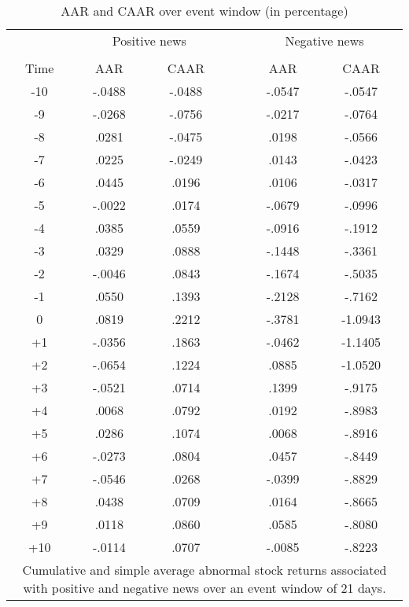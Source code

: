 \begin{table}[H]
\centering
\begin{tabular}{cccccc}
  \hline
   & \multicolumn{2}{c}{Positive news} & \multicolumn{1}{p{1.5cm}}{} & \multicolumn{2}{c}{Negative news}  \\ \cline{2-3} \cline{5-6}
   \\
  Time & AAR & CAAR & & AAR & CAAR \\   
 \hline
-10 & -.0488 & -.0488 & & -.0547 & -.0547 \\ 
  -9 & -.0268 & -.0756 & & -.0217 & -.0764 \\ 
  -8 & .0281 & -.0475 & & .0198 & -.0566 \\ 
  -7 & .0225 & -.0249 & & .0143 & -.0423 \\ 
  -6 & .0445 & .0196 & & .0106 & -.0317 \\ 
  -5 & -.0022 & .0174 & & -.0679 & -.0996 \\ 
  -4 & .0385 & .0559 & & -.0916 & -.1912 \\ 
  -3 & .0329 & .0888 & &-.1448 & -.3361 \\ 
  -2 & -.0046 & .0843 & & -.1674 & -.5035 \\ 
  -1 & .0550 & .1393 & & -.2128 & -.7162 \\ 
  0 & .0819 & .2212 & &-.3781 & -1.0943 \\ 
  +1 & -.0356 & .1863 & & -.0462 & -1.1405 \\ 
  +2 & -.0654 & .1224 & & .0885 & -1.0520 \\ 
  +3 & -.0521 & .0714 & & .1399 & -.9175 \\ 
  +4 & .0068 & .0792 & & .0192 & -.8983 \\ 
  +5 & .0286 & .1074 & & .0068 & -.8916 \\ 
  +6 & -.0273 & .0804 & & .0457 & -.8449 \\ 
  +7 & -.0546 & .0268 & & -.0399 & -.8829 \\ 
  +8 & .0438 & .0709 & & .0164 & -.8665 \\ 
  +9 & .0118 & .0860 & & .0585 & -.8080 \\ 
  +10 & -.0114 & .0707 & & -.0085 & -.8223 \\ 
   \hline \hline
   \multicolumn{6}{p{10cm}}{\footnotesize Cumulative and simple average abnormal stock returns associated with positive and negative news over an event window of 21 days.} \\
   \hline
\end{tabular}
\caption{AAR and CAAR over event window (in percentage)} 
\end{table}

